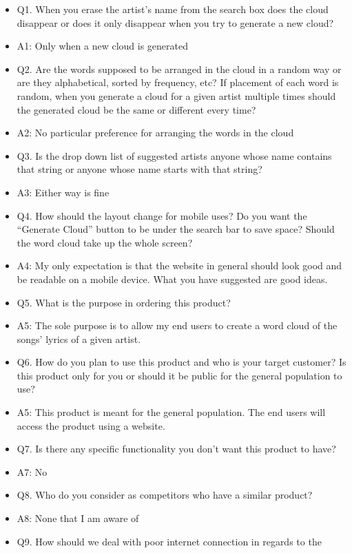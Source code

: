 \documentclass[]{article}
\begin{document}
\begin{itemize}
\itemsep1pt\parskip0pt
\item
  Q1. When you erase the artist's name from the search box does the
  cloud disappear or does it only disappear when you try to generate a
  new cloud?
\item
  A1: Only when a new cloud is generated
\item
  Q2. Are the words supposed to be arranged in the cloud in a random way
  or are they alphabetical, sorted by frequency, etc? If placement of
  each word is random, when you generate a cloud for a given artist
  multiple times should the generated cloud be the same or different
  every time?
\item
  A2: No particular preference for arranging the words in the cloud
\item
  Q3. Is the drop down list of suggested artists anyone whose name
  contains that string or anyone whose name starts with that string?
\item
  A3: Either way is fine
\item
  Q4. How should the layout change for mobile uses? Do you want the
  ``Generate Cloud'' button to be under the search bar to save space?
  Should the word cloud take up the whole screen?
\item
  A4: My only expectation is that the website in general should look
  good and be readable on a mobile device. What you have suggested are
  good ideas.
\item
  Q5. What is the purpose in ordering this product?
\item
  A5: The sole purpose is to allow my end users to create a word cloud
  of the songs' lyrics of a given artist.
\item
  Q6. How do you plan to use this product and who is your target
  customer? Is this product only for you or should it be public for the
  general population to use?
\item
  A5: This product is meant for the general population. The end users
  will access the product using a website.
\item
  Q7. Is there any specific functionality you don't want this product to
  have?
\item
  A7: No
\item
  Q8. Who do you consider as competitors who have a similar product?
\item
  A8: None that I am aware of
\item
  Q9. How should we deal with poor internet connection in regards to the

\end{itemize}
\end{document}
